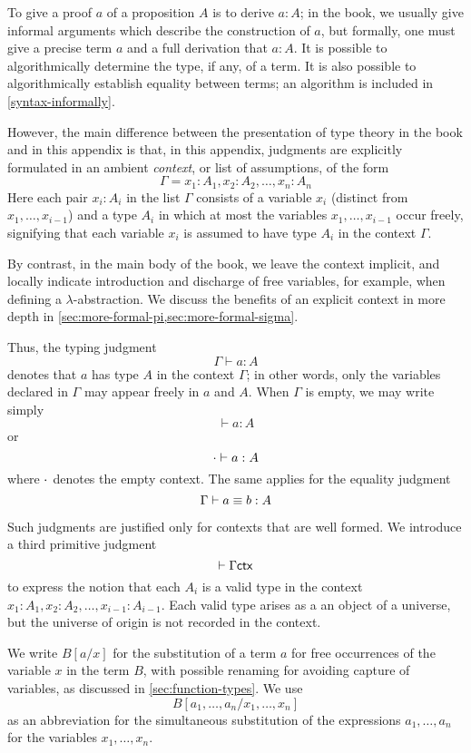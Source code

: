 To give a proof $a$ of a proposition $A$ is to derive $a:A$; in the book, we
usually give informal arguments which describe the construction of $a$, but
formally, one must give a precise term $a$ and a full derivation that $a:A$. It
is possible to algorithmically determine the type, if any, of a term. It is also
possible to algorithmically establish equality between terms; an algorithm is
included in \autoref{syntax-informally}.

However, the main difference between the presentation of type theory in the book
and in this appendix is that, in this appendix, judgments are explicitly
formulated in an ambient {\em context}, or list of assumptions, of the form
\[
  \Gamma =  x_1:A_1, x_2:A_2,\dots,x_n:A_n
\]
Here each pair $x_i:A_i$ in the list $\Gamma$ consists of a variable $x_i$
(distinct from $x_1,\dots,x_{i-1}$) and a type $A_i$ in which at most the
variables $x_1,\dots,x_{i-1}$ occur freely, signifying that each variable $x_i$
is assumed to have type $A_i$ in the context $\Gamma$.  

By contrast, in the main body of the book, we leave the context implicit, and
locally indicate introduction and discharge of free variables, for example, when
defining a $\lambda$-abstraction. We discuss the benefits of an explicit 
context in more depth in \autoref{sec:more-formal-pi,sec:more-formal-sigma}.

Thus, the typing judgment
\[
  \Gamma \vdash a:A
\]
denotes that $a$ has type $A$ in the context $\Gamma$; in other words, only the
variables declared in $\Gamma$ may appear freely in $a$ and $A$. When $\Gamma$
is empty, we may write simply
\[
  \vdash a:A
\]
or
\[
  \cdot \vdash a:A
\]
where $\cdot$ denotes the empty context. The same applies for the equality
judgment
\[
  \Gamma \vdash a\equiv b:A
\]

Such judgments are justified only for contexts that are well formed.  We
introduce a third primitive judgment
\[
  \vdash \Gamma \mathsf{ctx}
\]
to express the notion that each $A_i$ is a valid
type in the context $x_1:A_1, x_2:A_2,\dots,x_{i-1}:A_{i-1}$.
Each valid type arises as a an object of a universe, but the universe of origin
is not recorded in the context.

We write $B[a/x]$ for the substitution of a term $a$ for free occurrences of
the variable $x$ in the term $B$, with possible renaming for avoiding capture
of variables, as discussed in \autoref{sec:function-types}.  We use
$$B[a_1,\dots,a_n/x_1,\dots,x_n]$$ as an abbreviation for the simultaneous
substitution of the expressions $a_1,\dots,a_n$ for the variables
$x_1,\dots,x_n$.

